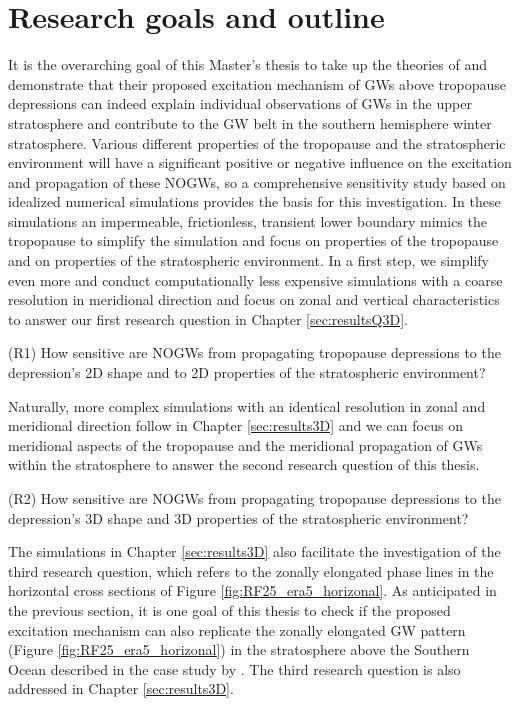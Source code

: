 \section{Research goals and outline}
\label{sec:goals}
It is the overarching goal of this Master's thesis to take up the theories of \textcite[]{dornbrack_stratospheric_2022} and demonstrate that their proposed excitation mechanism of GWs above tropopause depressions can indeed explain individual observations of GWs in the upper stratosphere and contribute to the GW belt in the southern hemisphere winter stratosphere. Various different properties of the tropopause and the stratospheric environment will have a significant positive or negative influence on the excitation and propagation of these NOGWs, so a comprehensive sensitivity study based on idealized numerical simulations provides the basis for this investigation. In these simulations an impermeable, frictionless, transient lower boundary mimics the tropopause to simplify the simulation and focus on properties of the tropopause and on properties of the stratospheric environment. In a first step, we simplify even more and conduct computationally less expensive simulations with a coarse resolution in meridional direction and focus on zonal and vertical characteristics to answer our first research question in Chapter \ref{sec:resultsQ3D}.
\begin{tcolorbox}[]
    (R1) How sensitive are NOGWs from propagating tropopause depressions to the depression's 2D shape and to 2D properties of the stratospheric environment?
\end{tcolorbox}
Naturally, more complex simulations with an identical resolution in zonal and meridional direction follow in Chapter \ref{sec:results3D} and we can focus on meridional aspects of the tropopause and the meridional propagation of GWs within the stratosphere to answer the second research question of this thesis.
\begin{tcolorbox}[]
    (R2) How sensitive are NOGWs from propagating tropopause depressions to the depression's 3D shape and 3D properties of the stratospheric environment?
\end{tcolorbox}
The simulations in Chapter \ref{sec:results3D} also facilitate the investigation of the third research question, which refers to the zonally elongated phase lines in the horizontal cross sections of Figure \ref{fig:RF25_era5_horizonal}. As anticipated in the previous section, it is one goal of this thesis to check if the proposed excitation mechanism can also replicate the zonally elongated GW pattern (Figure \ref{fig:RF25_era5_horizonal}) in the stratosphere above the Southern Ocean described in the case study by \textcite[]{dornbrack_stratospheric_2022}. The third research question is also addressed in Chapter \ref{sec:results3D}. %
